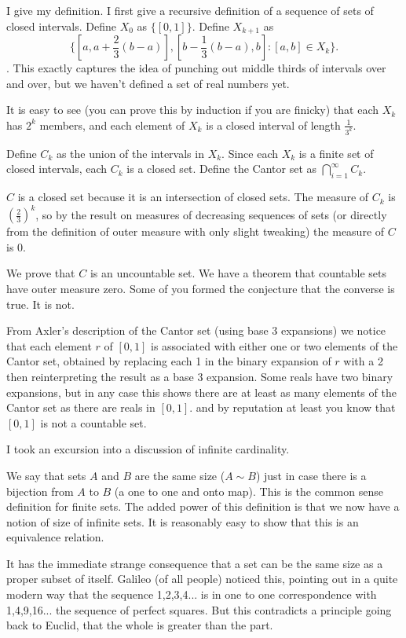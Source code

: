 \documentclass[12pt]{article}
\begin{document}
I give my definition.  I first give a recursive definition of a sequence of sets of closed intervals.  Define $X_0$ as $\{[0,1]\}$.  Define $X_{k+1}$ as $$\{[a,a+\frac23(b-a)],[b-\frac13(b-a),b]:[a,b]\in X_k\}.$$.  This exactly captures the idea of punching out middle thirds of intervals over and over, but we haven't defined a set of real numbers yet.

It is easy to see (you can prove this by induction if you are finicky) that each $X_k$ has $2^k$ members, and each element of $X_k$ is a closed interval of length $\frac1{3^k}$.

Define $C_k$ as the union of the intervals in $X_k$.  Since each $X_k$ is a finite set of closed intervals, each $C_k$ is a closed set.  Define the Cantor set as $\bigcap_{i=1}^\infty C_k$.

$C$ is a closed set because it is an intersection of closed sets.  The measure of $C_k$ is $\left(\frac23\right)^k$, so by the result on measures of decreasing sequences of sets (or directly from the definition of outer measure with only slight tweaking) the measure of $C$ is 0.

We prove that $C$ is an uncountable set.  We have a theorem that countable sets have outer measure zero.  Some of you formed the conjecture that the converse is true.  It is not.

From Axler's description of the Cantor set (using base 3 expansions) we notice that each element $r$ of $[0,1]$ is associated with either one or two elements of the Cantor set, obtained by
replacing each 1 in the binary expansion of $r$ with a 2 then reinterpreting the result as a base 3 expansion.  Some reals have two binary expansions, but in any case this shows there are at least
as many elements of the Cantor set as there are reals in $[0,1]$. and by reputation at least you know that $[0,1]$ is not a countable set.

I took an excursion into a discussion of infinite cardinality.

We say that sets $A$ and $B$ are the same size ($A \sim B$) just in case there is a bijection from $A$ to $B$ (a one to one and onto map).  This is the common sense definition for finite sets.
The added power of this definition is that we now have a notion of size of infinite sets.  It is reasonably easy to show that this is an equivalence relation.

It has the immediate strange consequence that a set can be the same size as a proper subset of itself.  Galileo (of all people) noticed this, pointing out in a quite modern way that
the sequence 1,2,3,4...  is in one to one correspondence with 1,4,9,16... the sequence of perfect squares.  But this contradicts a principle going back to Euclid, that the whole is greater than the part.
\end{document}
